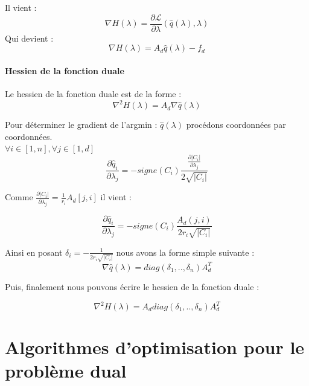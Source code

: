 Il vient : 
\begin{equation}
\nabla H(\lambda) = \frac{ \partial \mathcal{L}}{\partial \lambda} (\hat{q}(\lambda), \lambda)
\end{equation}
Qui devient : 
\begin{equation}
\nabla H(\lambda) = A_d\hat{q}(\lambda) - f_d
\end{equation}

\paragraph{Hessien de la fonction duale}
Le hessien de la fonction duale est de la forme :
\begin{equation}
\nabla^2 H(\lambda) = A_d \nabla \hat{q}(\lambda)
\end{equation}

Pour déterminer le gradient de l'argmin : $\hat{q}(\lambda)$ procédons coordonnées par coordonnées. 
\\
$\forall i  \in [1,n], \forall j \in [1, d]$
\begin{equation}
\frac{\partial \hat{q}_i}{\partial \lambda_j} = - signe(C_i)\frac{\frac{\partial \vert C_i \vert }{\partial \lambda_j}}{2\sqrt{\vert C_i \vert}} 
\end{equation}

Comme $\frac{\partial \vert C_i \vert }{\partial \lambda_j} = \frac{1}{r_i}A_d[j,i]$ il vient : 

\begin{equation}
\frac{\partial \hat{q}_i}{\partial \lambda_j} = - signe(C_i)\frac{A_d(j,i)}{2r_i\sqrt{\vert C_i \vert}} 
\end{equation}

Ainsi en posant $\delta_i = -\frac{1}{2r_i\sqrt{\vert C_i \vert}}$ nous avons la forme simple suivante : 
\begin{equation}
\nabla \hat{q}(\lambda) = diag(\delta_1 , .. , \delta_n)A_d^T
\end{equation}

Puis, finalement nous pouvons écrire le hessien de la fonction duale : 

\begin{equation}
\nabla^2 H(\lambda) = A_ddiag(\delta_1 , .. , \delta_n)A_d^T
\end{equation}

\section{Algorithmes d'optimisation pour le problème dual}

